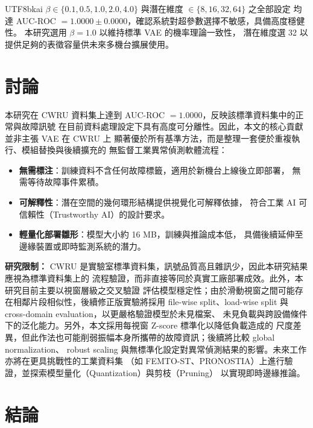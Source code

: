 \documentclass[conference]{IEEEtran}
\begin{document}
\begin{CJK}{UTF8}{bkai}
$\beta\in\{0.1,0.5,1.0,2.0,4.0\}$ 與潛在維度 $\in\{8,16,32,64\}$ 之全部設定
均達 AUC-ROC $=1.0000\pm0.0000$，確認系統對超參數選擇不敏感，具備高度穩健性。
本研究選用 $\beta=1.0$ 以維持標準 VAE 的機率理論一致性，
潛在維度選 32 以提供足夠的表徵容量供未來多機台擴展使用。

\section{討論}

本研究在 CWRU 資料集上達到 AUC-ROC $=1.0000$，反映該標準資料集中的正常與故障訊號
在目前資料處理設定下具有高度可分離性。因此，本文的核心貢獻並非主張 VAE 在 CWRU 上
顯著優於所有基準方法，而是整理一套便於重複執行、模組替換與後續擴充的
無監督工業異常偵測軟體流程：

\begin{itemize}
  \item \textbf{無需標注}：訓練資料不含任何故障標籤，適用於新機台上線後立即部署，
        無需等待故障事件累積。
  \item \textbf{可解釋性}：潛在空間的幾何環形結構提供視覺化可解釋依據，
        符合工業 AI 可信賴性（Trustworthy AI）的設計要求。
  \item \textbf{輕量化部署雛形}：模型大小約 16 MB，訓練與推論成本低，
        具備後續延伸至邊緣裝置或即時監測系統的潛力。
\end{itemize}

\textbf{研究限制：}
CWRU 是實驗室標準資料集，訊號品質高且雜訊少，因此本研究結果應視為標準資料集上的
流程驗證，而非直接等同於真實工廠部署成效。此外，本研究目前主要以視窗層級之交叉驗證
評估模型穩定性；由於滑動視窗之間可能存在相鄰片段相似性，後續修正版實驗將採用
file-wise split、load-wise split 與 cross-domain evaluation，以更嚴格驗證模型於未見檔案、
未見負載與跨設備條件下的泛化能力。另外，本文採用每視窗 Z-score 標準化以降低負載造成的
尺度差異，但此作法也可能削弱振幅本身所攜帶的故障資訊；後續將比較 global normalization、
robust scaling 與無標準化設定對異常偵測結果的影響。未來工作亦將在更具挑戰性的工業資料集
（如 FEMTO-ST、PRONOSTIA）上進行驗證，並探索模型量化（Quantization）與剪枝（Pruning）
以實現即時邊緣推論。

\section{結論}


\end{CJK}
\end{document}
